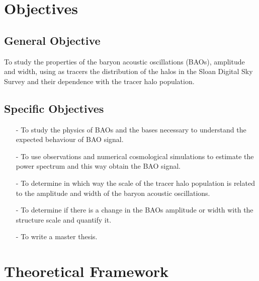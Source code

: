 \documentclass[a4,useAMS,usegraphicx,12pt]{article}
\begin{document}
\section{Objectives}

\subsection*{General Objective}


To study the properties of the baryon acoustic oscillations (BAOs), amplitude and width, using as
tracers the distribution of the halos in the Sloan Digital Sky Survey and their dependence with the tracer
halo population.

\subsection*{Specific Objectives}

\begin{itemize} 

\item[-] To study the physics of BAOs and the bases necessary to understand
the expected behaviour of BAO signal. 

\item[-] To use observations and numerical cosmological simulations to estimate the power 
spectrum and this way obtain the BAO signal.  

\item[-] To determine in which way the scale of the tracer halo population is related to the 
amplitude and width of the baryon acoustic oscillations. 

\item[-] To determine if there is a change in the BAOs amplitude or width with the structure scale and quantify it. 

\item[-] To write a master thesis.

\end{itemize}


\section{Theoretical Framework}
\end{document}
